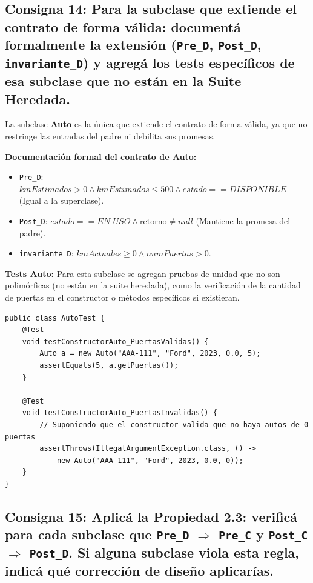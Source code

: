 \subsection{Consigna 14: Para la subclase que extiende el contrato de forma válida: documentá formalmente la extensión (\texttt{Pre\_D}, \texttt{Post\_D}, \texttt{invariante\_D}) y agregá los tests específicos de esa subclase que no están en la Suite Heredada.}

La subclase \textbf{Auto} es la única que extiende el contrato de forma válida, ya que no restringe las entradas del padre ni debilita sus promesas.

\textbf{Documentación formal del contrato de Auto:}
\begin{itemize}
    \item \texttt{Pre\_D}: $kmEstimados > 0 \land kmEstimados \le 500 \land estado == DISPONIBLE$ (Igual a la superclase).
    \item \texttt{Post\_D}: $estado == EN\_USO \land \mathrm{retorno} \neq null$ (Mantiene la promesa del padre).
    \item \texttt{invariante\_D}: $kmActuales \ge 0 \land numPuertas > 0$.
\end{itemize}

\textbf{Tests Auto:} Para esta subclase se agregan pruebas de unidad que no son polimórficas (no están en la suite heredada), como la verificación de la cantidad de puertas en el constructor o métodos específicos si existieran.

\begin{verbatim}
public class AutoTest {
    @Test
    void testConstructorAuto_PuertasValidas() {
        Auto a = new Auto("AAA-111", "Ford", 2023, 0.0, 5);
        assertEquals(5, a.getPuertas());
    }

    @Test
    void testConstructorAuto_PuertasInvalidas() {
        // Suponiendo que el constructor valida que no haya autos de 0 puertas
        assertThrows(IllegalArgumentException.class, () -> 
            new Auto("AAA-111", "Ford", 2023, 0.0, 0));
    }
}
\end{verbatim}


\subsection{Consigna 15: Aplicá la Propiedad 2.3: verificá para cada subclase que \texttt{Pre\_D} $\Rightarrow$ \texttt{Pre\_C} y \texttt{Post\_C} $\Rightarrow$ \texttt{Post\_D}. Si alguna subclase viola esta regla, indicá qué corrección de diseño aplicarías.}

